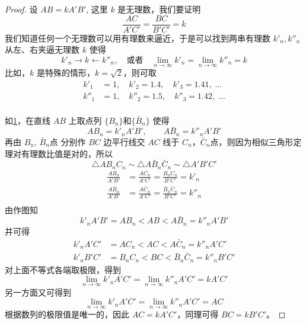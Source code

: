 \begin{proof}
设 $AB=kA'B'$, 这里 $k$ 是无理数，我们要证明
\[\frac{AC}{A'C'}=\frac{BC}{B'C'}=k\]
我们知道任何一个无理数可以用有理数来逼近，于是可以找到两串有理数 $k'_n,k''_n$ 从左、右夹逼无理数 $k$ 使得
\[k'_n\to k\leftarrow k''_n,\quad \text{或者}\quad \lim_{n\to\infty}k'_n=\lim_{n\to\infty}k''_n=k\]
比如，$k$ 是特殊的情形，$k=\sqrt{2}$，则可取
\[\begin{split}
    k'_1&=1,\quad     k'_2=1.4,\quad    k'_3=1.41,\;\ldots\\ 
    k''_1&=1,\quad     k''_2=1.5,\quad    k''_3=1.42,\;\ldots\\
\end{split}\]

\begin{figure}
    \caption{}\label{fig:sim_ratio}
\end{figure}

如\cref{fig:sim_ratio}，在直线 $AB$ 上取点列 $\{B_n\}$和$\{\bar{B}_n\}$ 使得
\[AB_n=k'_nA'B',\qquad A\bar{B}_n=k''_n A'B'\]
再由 $B_n$, $\bar{B}_n$点 分别作 $BC$ 边平行线交 $AC$ 线于 $C_n$，$\bar{C}_n$点，则因为相似三角形定理对有理数比值是对的，所以
\[\triangle AB_nC_n \sim \triangle A\bar{B}_n\bar{C}_n \sim \triangle A'B'C'\]
\[\begin{split}
  \frac{AB_n}{A'B'}&=\frac{AC_n}{A'C'}=\frac{B_nC_n}{B'C'}=k'_n\\
  \frac{A\bar{B}_n}{A'B'}&=\frac{A\bar{C}_n}{A'C'}=\frac{\bar{B}_n\bar{C}_n}{B'C'}=k''_n\\
\end{split}\]
由作图知
\[k'_nA'B'=AB_n<AB<A\bar{B}_n=k''_nA'B'\]
并可得
\[\begin{split}
     k'_nA'C'&=AC_n<AC<A\bar{C}_n=k''_nA'C'\\
k'_nB'C'&=B_nC_n<BC<\bar{B}_n\bar{C}_n=k''_nB'C'
\end{split}\]
对上面不等式各端取极限，得到
\[\lim_{n\to\infty} k'_n A'C'  =  \lim_{n\to\infty}k''_n A'C'   =kA'C'\]
另一方面又可得到
\[\lim_{n\to\infty} k'_n A'C' = \lim_{n\to\infty}k''_n A'C'  =AC\]
根据数列的极限值是唯一的，因此 $AC=kA'C'$，同理可得
$BC=kB'C'$。
\end{proof}

